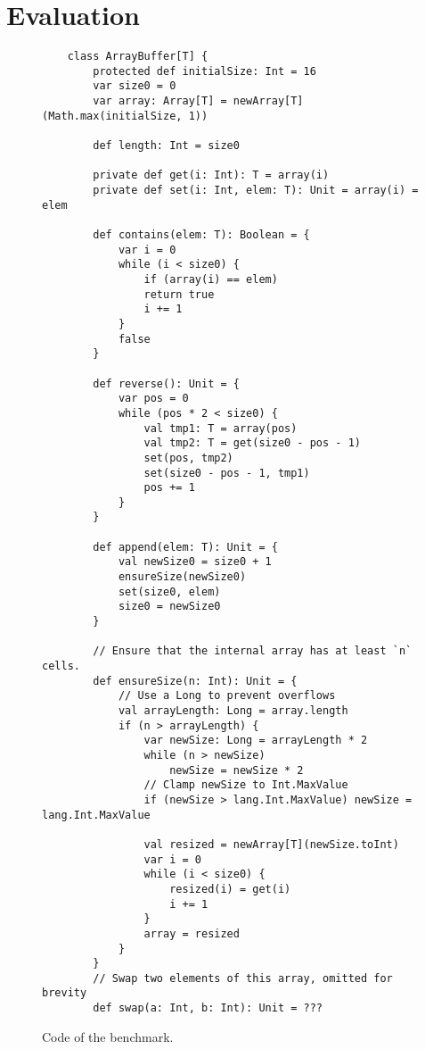 \chapter{Evaluation}

\begin{figure}[!htb]
	\begin{verbatim}
	class ArrayBuffer[T] {
		protected def initialSize: Int = 16
		var size0 = 0
		var array: Array[T] = newArray[T](Math.max(initialSize, 1))
		
		def length: Int = size0
		
		private def get(i: Int): T = array(i)
		private def set(i: Int, elem: T): Unit = array(i) = elem
		
		def contains(elem: T): Boolean = {
			var i = 0
			while (i < size0) {
				if (array(i) == elem)
				return true
				i += 1
			}
			false
		}
		
		def reverse(): Unit = {
			var pos = 0
			while (pos * 2 < size0) {
				val tmp1: T = array(pos)
				val tmp2: T = get(size0 - pos - 1)
				set(pos, tmp2)
				set(size0 - pos - 1, tmp1)
				pos += 1
			}
		}
		
		def append(elem: T): Unit = {
			val newSize0 = size0 + 1
			ensureSize(newSize0)
			set(size0, elem)
			size0 = newSize0
		}
		
		// Ensure that the internal array has at least `n` cells. 
		def ensureSize(n: Int): Unit = {
			// Use a Long to prevent overflows
			val arrayLength: Long = array.length 
			if (n > arrayLength) {
				var newSize: Long = arrayLength * 2
				while (n > newSize)
					newSize = newSize * 2
				// Clamp newSize to Int.MaxValue
				if (newSize > lang.Int.MaxValue) newSize = lang.Int.MaxValue
				
				val resized = newArray[T](newSize.toInt)
				var i = 0
				while (i < size0) {
					resized(i) = get(i)
					i += 1
				}
				array = resized
			}
		}
		// Swap two elements of this array, omitted for brevity
		def swap(a: Int, b: Int): Unit = ??? 
	\end{verbatim}
	\caption{Code of the  benchmark.}
	\label{example:arraybuffer-benchmark}
\end{figure}
